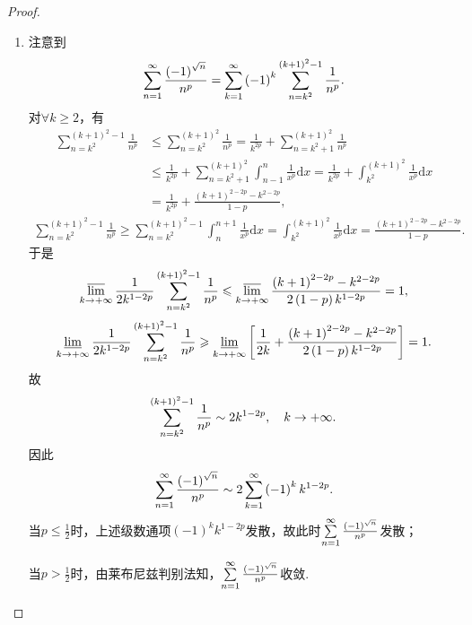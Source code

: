 \documentclass[../../main.tex]{subfiles}%
\begin{document}
\begin{proof}
\begin{enumerate}[(1)]
\item 注意到
\begin{align*}
\sum_{n=1}^{\infty}\limits\frac{\left( -1 \right) ^{\sqrt{n}}}{n^p}=\sum_{k=1}^{\infty}\limits\left( -1 \right) ^k\sum_{n=k^2}^{\left( k+1 \right) ^2-1}\limits\frac{1}{n^p}.
\end{align*}
对$\forall k\geqslant 2$，有
\begin{align*}
\sum_{n=k^2}^{\left( k+1 \right) ^2-1}{\frac{1}{n^p}}&\leqslant \sum_{n=k^2}^{\left( k+1 \right) ^2}{\frac{1}{n^p}}=\frac{1}{k^{2p}}+\sum_{n=k^2+1}^{\left( k+1 \right) ^2}{\frac{1}{n^p}}
\\
&\leqslant \frac{1}{k^{2p}}+\sum_{n=k^2+1}^{\left( k+1 \right) ^2}{\int_{n-1}^n{\frac{1}{x^p}\mathrm{d}x}}=\frac{1}{k^{2p}}+\int_{k^2}^{\left( k+1 \right) ^2}{\frac{1}{x^p}\mathrm{d}x}
\\
&=\frac{1}{k^{2p}}+\frac{\left( k+1 \right) ^{2-2p}-k^{2-2p}}{1-p},
\end{align*}
\begin{align*}
\sum_{n=k^2}^{\left( k+1 \right) ^2-1}{\frac{1}{n^p}}\geqslant \sum_{n=k^2}^{\left( k+1 \right) ^2-1}{\int_n^{n+1}{\frac{1}{x^p}\mathrm{d}x}}=\int_{k^2}^{\left( k+1 \right) ^2}{\frac{1}{x^p}\mathrm{d}x}=\frac{\left( k+1 \right) ^{2-2p}-k^{2-2p}}{1-p}.
\end{align*}
于是
\begin{align*}
\varlimsup_{k\rightarrow +\infty}\limits\frac{1}{2k^{1-2p}}\sum_{n=k^2}^{\left( k+1 \right) ^2-1}\limits\frac{1}{n^p}\leqslant \varlimsup_{k\rightarrow +\infty}\limits\frac{\left( k+1 \right) ^{2-2p}-k^{2-2p}}{2\left( 1-p \right) k^{1-2p}}=1,
\end{align*}
\begin{align*}
\varliminf_{k\rightarrow +\infty}\limits\frac{1}{2k^{1-2p}}\sum_{n=k^2}^{\left( k+1 \right) ^2-1}\limits\frac{1}{n^p}\geqslant \varliminf_{k\rightarrow +\infty}\limits\left[ \frac{1}{2k}+\frac{\left( k+1 \right) ^{2-2p}-k^{2-2p}}{2\left( 1-p \right) k^{1-2p}} \right] =1.
\end{align*}
故
\begin{align*}
\sum_{n=k^2}^{\left( k+1 \right) ^2-1}\limits\frac{1}{n^p}\sim 2k^{1-2p},\quad k\rightarrow +\infty.
\end{align*}
因此
\begin{align*}
\sum_{n=1}^{\infty}\limits\frac{\left( -1 \right) ^{\sqrt{n}}}{n^p}\sim 2\sum_{k=1}^{\infty}\limits\left( -1 \right) ^kk^{1-2p}.
\end{align*}
当$p\leqslant \frac{1}{2}$时，上述级数通项$\left( -1 \right) ^kk^{1-2p}$发散，故此时$\sum_{n=1}^{\infty}\limits\frac{\left( -1 \right) ^{\sqrt{n}}}{n^p}$发散；

当$p>\frac{1}{2}$时，由莱布尼兹判别法知，$\sum_{n=1}^{\infty}\limits\frac{\left( -1 \right) ^{\sqrt{n}}}{n^p}$收敛.
\end{enumerate}
\end{proof}
\end{document}
